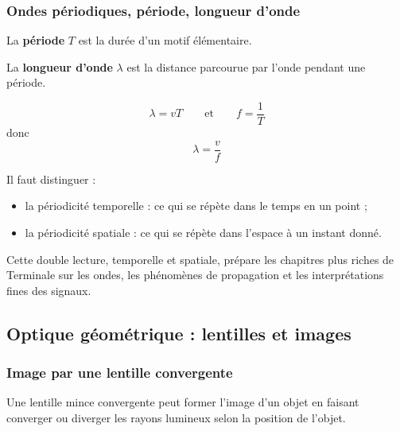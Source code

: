 \documentclass[11pt,a4paper]{article}
\begin{document}
\subsubsection{Ondes périodiques, période, longueur d'onde}

\begin{definitionbox}
La \textbf{période} \(T\) est la durée d'un motif élémentaire.
\end{definitionbox}

\begin{definitionbox}
La \textbf{longueur d'onde} \(\lambda\) est la distance parcourue par l'onde pendant une période.
\end{definitionbox}

\begin{proprbox}
\[
\lambda=vT
\qquad \text{et} \qquad
f=\frac1T
\]
donc
\[
\lambda=\frac{v}{f}
\]
\end{proprbox}

\begin{sensbox}
Il faut distinguer :
\begin{itemize}
    \item la périodicité temporelle : ce qui se répète dans le temps en un point ;
    \item la périodicité spatiale : ce qui se répète dans l'espace à un instant donné.
\end{itemize}
\end{sensbox}

\begin{terminalebox}
Cette double lecture, temporelle et spatiale, prépare les chapitres plus riches de Terminale sur les ondes, les phénomènes de propagation et les interprétations fines des signaux.
\end{terminalebox}

\subsection{Optique géométrique : lentilles et images}

\subsubsection{Image par une lentille convergente}

\begin{definitionbox}
Une lentille mince convergente peut former l'image d'un objet en faisant converger ou diverger les rayons lumineux selon la position de l'objet.
\end{definitionbox}
\end{document}
